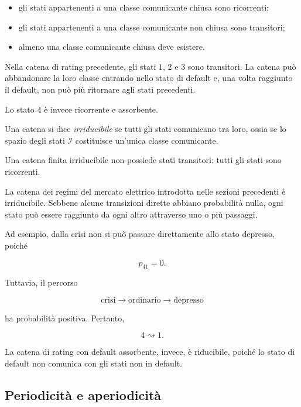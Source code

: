\begin{itemize}

\item gli stati appartenenti a una classe comunicante chiusa sono
ricorrenti;

\item gli stati appartenenti a una classe comunicante non chiusa sono
transitori;

\item almeno una classe comunicante chiusa deve esistere.
\end{itemize}

Nella catena di rating precedente, gli stati \(1\), \(2\) e \(3\) sono
transitori. La catena pu\`{o} abbandonare la loro classe entrando nello
stato di default e, una volta raggiunto il default, non pu\`{o} pi\`{u}
ritornare agli stati precedenti.

Lo stato \(4\) \`{e} invece ricorrente e assorbente.

\begin{definition}
Una catena si dice \emph{irriducibile} se tutti gli stati comunicano
tra loro, ossia se lo spazio degli stati \(\mathcal{I}\) costituisce
un'unica classe comunicante.
\end{definition}

Una catena finita irriducibile non possiede stati transitori: tutti gli
stati sono ricorrenti.

La catena dei regimi del mercato elettrico introdotta nelle sezioni
precedenti \`{e} irriducibile. Sebbene alcune transizioni dirette
abbiano probabilit\`{a} nulla, ogni stato pu\`{o} essere raggiunto da
ogni altro attraverso uno o pi\`{u} passaggi.

Ad esempio, dalla crisi non si pu\`{o} passare direttamente allo stato
depresso, poich\'{e}

\[
p_{41}=0.
\]

Tuttavia, il percorso

\[
\text{crisi}
\longrightarrow
\text{ordinario}
\longrightarrow
\text{depresso}
\]

ha probabilit\`{a} positiva. Pertanto,

\[
4\rightsquigarrow 1.
\]

La catena di rating con default assorbente, invece, \`{e} riducibile,
poich\'{e} lo stato di default non comunica con gli stati non in
default.

\subsection{Periodicit\`{a} e aperiodicit\`{a}}

